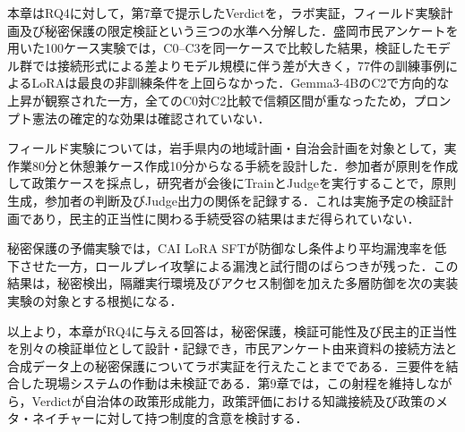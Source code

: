 本章はRQ4に対して，第7章で提示したVerdictを，ラボ実証，フィールド実験計画及び秘密保護の限定検証という三つの水準へ分解した．盛岡市民アンケートを用いた100ケース実験では，C0--C3を同一ケースで比較した結果，検証したモデル群では接続形式による差よりモデル規模に伴う差が大きく，77件の訓練事例によるLoRAは最良の非訓練条件を上回らなかった．Gemma3-4BのC2で方向的な上昇が観察された一方，全てのC0対C2比較で信頼区間が重なったため，プロンプト憲法の確定的な効果は確認されていない．

フィールド実験については，岩手県内の地域計画・自治会計画を対象として，実作業80分と休憩兼ケース作成10分からなる手続を設計した．参加者が原則を作成して政策ケースを採点し，研究者が会後にTrainとJudgeを実行することで，原則生成，参加者の判断及びJudge出力の関係を記録する．これは実施予定の検証計画であり，民主的正当性に関わる手続受容の結果はまだ得られていない．

秘密保護の予備実験では，CAI LoRA SFTが防御なし条件より平均漏洩率を低下させた一方，ロールプレイ攻撃による漏洩と試行間のばらつきが残った．この結果は，秘密検出，隔離実行環境及びアクセス制御を加えた多層防御を次の実装実験の対象とする根拠になる．

以上より，本章がRQ4に与える回答は，秘密保護，検証可能性及び民主的正当性を別々の検証単位として設計・記録でき，市民アンケート由来資料の接続方法と合成データ上の秘密保護についてラボ実証を行えたことまでである．三要件を結合した現場システムの作動は未検証である．第9章では，この射程を維持しながら，Verdictが自治体の政策形成能力，政策評価における知識接続及び政策のメタ・ネイチャーに対して持つ制度的含意を検討する．

\printbibliography[heading=subbibliography,title={章末参考文献}]
